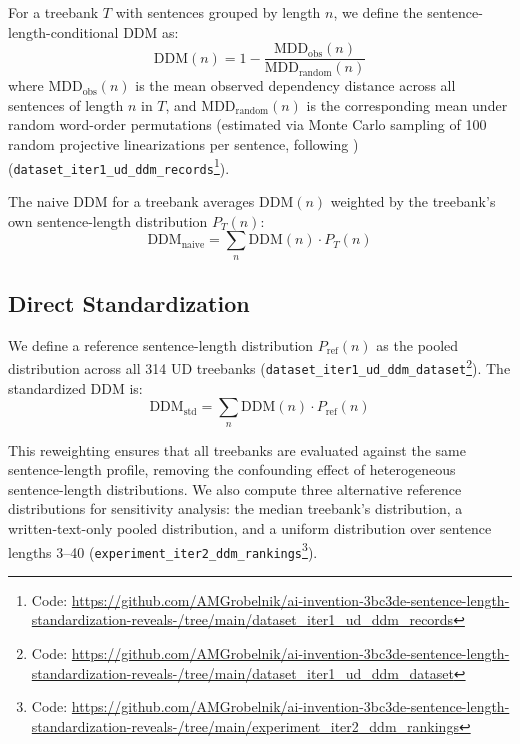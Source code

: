 \documentclass[11pt,letterpaper]{article}
\begin{document}
For a treebank $T$ with sentences grouped by length $n$, we define the sentence-length-conditional DDM as:
\begin{equation}
\text{DDM}(n) = 1 - \frac{\text{MDD}_{\text{obs}}(n)}{\text{MDD}_{\text{random}}(n)}
\end{equation}
where $\text{MDD}_{\text{obs}}(n)$ is the mean observed dependency distance across all sentences of length $n$ in $T$, and $\text{MDD}_{\text{random}}(n)$ is the corresponding mean under random word-order permutations (estimated via Monte Carlo sampling of 100 random projective linearizations per sentence, following \citet{Futrell2015}) (\texttt{dataset\_iter1\_ud\_ddm\_records}\footnote{Code: \url{https://github.com/AMGrobelnik/ai-invention-3bc3de-sentence-length-standardization-reveals-/tree/main/dataset_iter1_ud_ddm_records}}).

The naive DDM for a treebank averages $\text{DDM}(n)$ weighted by the treebank's own sentence-length distribution $P_T(n)$:
\begin{equation}
\text{DDM}_{\text{naive}} = \sum_n \text{DDM}(n) \cdot P_T(n)
\end{equation}

\subsection{Direct Standardization}

We define a reference sentence-length distribution $P_{\text{ref}}(n)$ as the pooled distribution across all 314 UD treebanks (\texttt{dataset\_iter1\_ud\_ddm\_dataset}\footnote{Code: \url{https://github.com/AMGrobelnik/ai-invention-3bc3de-sentence-length-standardization-reveals-/tree/main/dataset_iter1_ud_ddm_dataset}}). The standardized DDM is:
\begin{equation}
\text{DDM}_{\text{std}} = \sum_n \text{DDM}(n) \cdot P_{\text{ref}}(n)
\end{equation}

This reweighting ensures that all treebanks are evaluated against the same sentence-length profile, removing the confounding effect of heterogeneous sentence-length distributions. We also compute three alternative reference distributions for sensitivity analysis: the median treebank's distribution, a written-text-only pooled distribution, and a uniform distribution over sentence lengths 3--40 (\texttt{experiment\_iter2\_ddm\_rankings}\footnote{Code: \url{https://github.com/AMGrobelnik/ai-invention-3bc3de-sentence-length-standardization-reveals-/tree/main/experiment_iter2_ddm_rankings}}).
\end{document}

